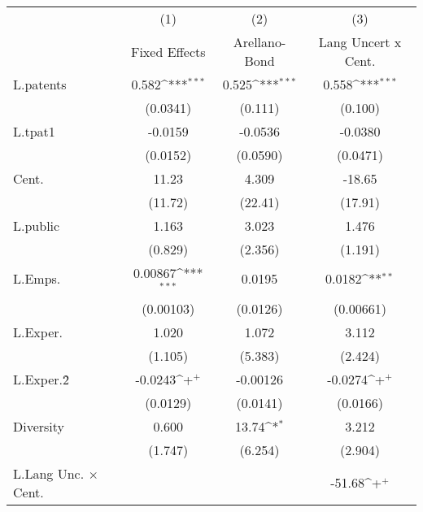 {
\def\sym#1{\ifmmode^{#1}\else\(^{#1}\)\fi}
\begin{tabular}{l*{3}{c}}
\hline\hline
                    &\multicolumn{1}{c}{(1)}&\multicolumn{1}{c}{(2)}&\multicolumn{1}{c}{(3)}\\
                    &\multicolumn{1}{c}{Fixed Effects}&\multicolumn{1}{c}{Arellano-Bond}&\multicolumn{1}{c}{Lang Uncert x Cent.}\\
\hline
L.patents           &       0.582\sym{***}&       0.525\sym{***}&       0.558\sym{***}\\
                    &    (0.0341)         &     (0.111)         &     (0.100)         \\
L.tpat1             &     -0.0159         &     -0.0536         &     -0.0380         \\
                    &    (0.0152)         &    (0.0590)         &    (0.0471)         \\
Cent.               &       11.23         &       4.309         &      -18.65         \\
                    &     (11.72)         &     (22.41)         &     (17.91)         \\
L.public            &       1.163         &       3.023         &       1.476         \\
                    &     (0.829)         &     (2.356)         &     (1.191)         \\
L.Emps.             &     0.00867\sym{***}&      0.0195         &      0.0182\sym{**} \\
                    &   (0.00103)         &    (0.0126)         &   (0.00661)         \\
L.Exper.            &       1.020         &       1.072         &       3.112         \\
                    &     (1.105)         &     (5.383)         &     (2.424)         \\
L.Exper.\^2         &     -0.0243\sym{+}  &    -0.00126         &     -0.0274\sym{+}  \\
                    &    (0.0129)         &    (0.0141)         &    (0.0166)         \\
Diversity           &       0.600         &       13.74\sym{*}  &       3.212         \\
                    &     (1.747)         &     (6.254)         &     (2.904)         \\
L.Lang Unc. $\times$ Cent.&                     &                     &      -51.68\sym{+}  \\

\end{tabular}}
